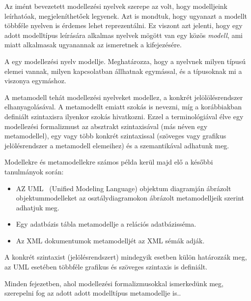 Az imént bevezetett modellezési nyelvek szerepe az volt, hogy modelljeink leírhatóak, megjeleníthetőek legyenek. Azt is mondtuk, hogy ugyanazt a modellt többféle nyelven is érdemes lehet reprezentálni. Ez viszont azt jelenti, hogy egy adott modelltípus leírására alkalmas nyelvek mögött van egy közös \emph{modell}, ami miatt alkalmasak ugyanannak az ismeretnek a kifejezésére.

\begin{definicio}
	A  egy modellezési nyelv modellje. Meghatározza, hogy a nyelvnek milyen típusú elemei vannak, milyen kapcsolatban állhatnak egymással, és a típusoknak mi a viszonya egymáshoz.
\end{definicio}

A metamodell tehát modellezési nyelveket modellez, a konkrét jelölölésrendszer elhanyagolásával. A metamodellt emiatt szokás  is nevezni, míg a korábbiakban definiált szintaxisra ilyenkor  szokás hivatkozni. Ezzel a terminológiával élve egy modellezési formalizmust az absztrakt szintaxisával (más néven egy metamodellel), egy vagy több konkrét szintaxissal (szöveges vagy grafikus jelölésrendszer a metamodell elemeihez) és a szemantikával adhatunk meg.

\begin{pelda}
	Modellekre és metamodellekre számos példa kerül majd elő a későbbi tanulmányok során:
	\begin{itemize}
		\item AZ UML~\cite{UML} (Unified Modeling Language) objektum diagramján ábrázolt objektummodelleket az osztálydiagramokon ábrázolt metamodelljeik szerint adhatjuk meg.
		\item Egy adatbázis tábla metamodellje a relációs adatbázisséma.
		\item Az XML dokumentumok metamodelljét az XML sémák adják.
	\end{itemize}
	A konkrét szintaxist (jelölésrendszert) mindegyik esetben külön határozzák meg, az UML esetében többféle grafikus és szöveges szintaxis is definiált.
\end{pelda}

\begin{tipp}
	Minden fejezetben, ahol modellezési formalizmusokkal ismerkedünk meg, szerepelni fog az adott adott modelltípus metamodellje is..
\end{tipp}

